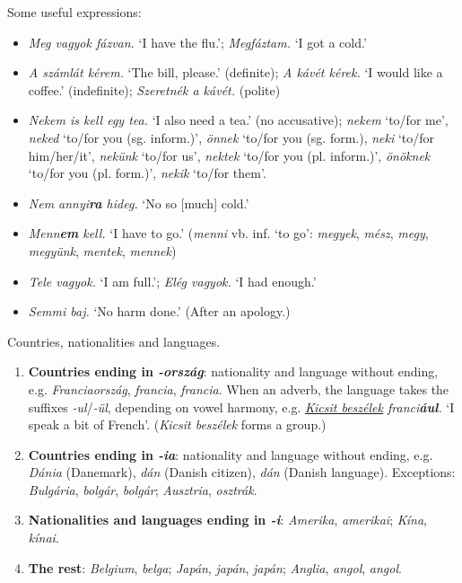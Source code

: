 \documentclass[a4paper,11pt]{article}
\begin{document}
Some useful expressions:
\begin{itemize}

  \item \emph{Meg vagyok fázvan.} `I have the flu.'; \emph{Megfáztam.}
    `I got a cold.'

  \item \emph{A számlát kérem.} `The bill, please.' (definite);
    \emph{A kávét kérek.} `I would like a coffee.' (indefinite);
    \emph{Szeretnék a kávét.} (polite)

  \item \emph{Nekem is kell egy tea.} `I also need a tea.' (no
    accusative); \emph{nekem} `to/for me', \emph{neked} `to/for you
    (sg. inform.)', \emph{önnek} `to/for you (sg. form.), \emph{neki}
    `to/for him/her/it', \emph{nekünk} `to/for us', \emph{nektek}
    `to/for you (pl. inform.)', \emph{önöknek} `to/for you
    (pl. form.)', \emph{nekik} `to/for them'.

  \item \emph{Nem annyi\textbf{ra} hideg.} `No so [much] cold.'

  \item \emph{Menn\textbf{em} kell.} `I have to go.' (\emph{menni}
    vb. inf. `to go': \emph{megyek}, \emph{mész}, \emph{megy},
    \emph{megyünk}, \emph{mentek}, \emph{mennek})

  \item \emph{Tele vagyok.} `I am full.'; \emph{Elég vagyok.} `I had
    enough.'

  \item \emph{Semmi baj.} `No harm done.' (After an apology.)

\end{itemize}

\noindent Countries, nationalities and languages.
\begin{enumerate}

  \item \textbf{Countries ending in \emph{-ország}}: nationality and
    language without ending, e.g. \emph{Franciaország},
    \emph{francia}, \emph{francia}. When an adverb, the language takes
    the suffixes \emph{-ul}/\emph{-ül}, depending on vowel harmony,
    e.g. \emph{\underline{Kicsit beszélek} franci\textbf{ául}.} `I
    speak a bit of French'. (\emph{Kicsit beszélek} forms a group.)

  \item \textbf{Countries ending in \emph{-ia}}: nationality and
    language without ending, e.g. \emph{Dánia} (Danemark), \emph{dán}
    (Danish citizen), \emph{dán} (Danish language). Exceptions:
    \emph{Bulgária}, \emph{bolgár}, \emph{bolgár}; \emph{Ausztria},
    \emph{osztrák}.

  \item \textbf{Nationalities and languages ending in \emph{-i}}:
    \emph{Amerika}, \emph{amerika\emph{i}}; \emph{Kína},
    \emph{kína\emph{i}}.

  \item \textbf{The rest}: \emph{Belgium}, \emph{belga}; \emph{Japán},
    \emph{japán}, \emph{japán}; \emph{Anglia}, \emph{angol},
    \emph{angol}.

\end{enumerate}
\end{document}
